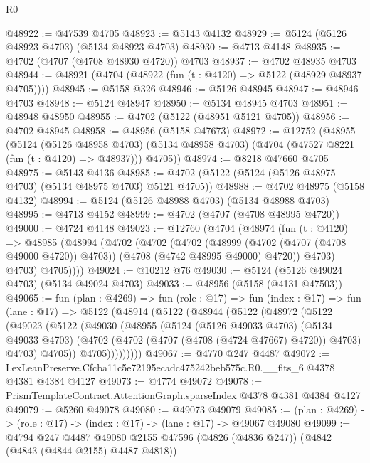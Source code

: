\begin{lexlean}{R0}
\begin{coremodule}
@48922 := @47539 @4705
@48923 := @5143 @4132
@48929 := @5124 (@5126 @48923 @4703) (@5134 @48923 @4703)
@48930 := @4713 @4148
@48935 := @4702 (@4707 (@4708 @48930 @4720)) @4703
@48937 := @4702 @48935 @4703
@48944 := @48921 (@4704 (@48922 (fun (t : @4120) => @5122 (@48929 @48937 @4705))))
@48945 := @5158 @326
@48946 := @5126 @48945
@48947 := @48946 @4703
@48948 := @5124 @48947
@48950 := @5134 @48945 @4703
@48951 := @48948 @48950
@48955 := @4702 (@5122 (@48951 @5121 @4705))
@48956 := @4702 @48945
@48958 := @48956 (@5158 @47673)
@48972 := @12752
    (@48955
      (@5124
        (@5126 @48958 @4703)
        (@5134 @48958 @4703)
        (@4704 (@47527 @8221 (fun (t : @4120) => @48937)))
        @4705))
@48974 := @8218 @47660 @4705
@48975 := @5143 @4136
@48985 := @4702 (@5122 (@5124 (@5126 @48975 @4703) (@5134 @48975 @4703) @5121 @4705))
@48988 := @4702 @48975 (@5158 @4132)
@48994 := @5124 (@5126 @48988 @4703) (@5134 @48988 @4703)
@48995 := @4713 @4152
@48999 := @4702 (@4707 (@4708 @48995 @4720))
@49000 := @4724 @4148
@49023 := @12760
    (@4704
      (@48974
        (fun (t : @4120) =>
        @48985
          (@48994
            (@4702
              (@4702
                (@4702
                  (@48999 (@4702 (@4707 (@4708 @49000 @4720)) @4703))
                  (@4708 (@4742 @48995 @49000) @4720))
                @4703)
              @4703)
            @4705))))
@49024 := @10212 @76
@49030 := @5124 (@5126 @49024 @4703) (@5134 @49024 @4703)
@49033 := @48956 (@5158 (@4131 @47503))
@49065 := fun (plan : @4269) =>
  fun (role : @17) =>
  fun (index : @17) =>
  fun (lane : @17) =>
  @5122
    (@48914
      (@5122
        (@48944
          (@5122
            (@48972
              (@5122
                (@49023
                  (@5122
                    (@49030
                      (@48955
                        (@5124
                          (@5126 @49033 @4703)
                          (@5134 @49033 @4703)
                          (@4702 (@4702 (@4707 (@4708 (@4724 @47667) @4720)) @4703) @4703)
                          @4705))
                      @4705)))))))))
@49067 := @4770 @247 @4487
@49072 := LexLeanPreserve.Cfcba11c5e72195ecadc475242beb575c.R0.__fits_6 @4378 @4381 @4384 @4127
@49073 := @4774 @49072
@49078 := PrismTemplateContract.AttentionGraph.sparseIndex @4378 @4381 @4384 @4127
@49079 := @5260 @49078
@49080 := @49073 @49079
@49085 := (plan : @4269) -> (role : @17) -> (index : @17) -> (lane : @17) -> @49067 @49080
@49099 := @4794
    @247
    @4487
    @49080
    @2155
    @47596
    (@4826 (@4836 @247))
    (@4842 (@4843 (@4844 @2155) @4487 @4818))

\end{coremodule}
\end{lexlean}
